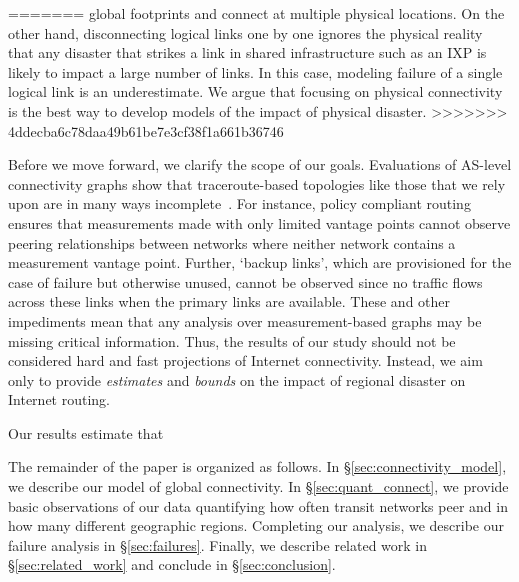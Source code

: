 =======
global footprints and connect at multiple physical locations.  On the other
hand, disconnecting logical links one by one ignores the physical reality that
any disaster that strikes a link in shared infrastructure such as an IXP is
likely to impact a large number of links.  In this case, modeling failure of a
single logical link is an underestimate.  We argue that focusing on physical
connectivity is the best way to develop models of the impact of physical
disaster. 
>>>>>>> 4ddecba6c78daa49b61be7e3cf38f1a661b36746


Before we move forward, we clarify the scope of our goals.  Evaluations of
AS-level connectivity graphs show that traceroute-based topologies like those
that we rely upon are in many ways incomplete~\cite{walter}.  For instance,
policy compliant routing ensures that measurements made with only limited
vantage points cannot observe peering relationships between networks where
neither network contains a measurement vantage point.  Further, `backup links',
which are provisioned for the case of failure but otherwise unused, cannot be
observed since no traffic flows across these links when the primary links are
available.  These and other impediments mean that any analysis over
measurement-based graphs may be missing critical information.  Thus, the
results of our study should not be considered hard and fast projections of
Internet connectivity.  Instead, we aim only to provide {\it estimates} and
{\it bounds} on the impact of regional disaster on Internet routing.

Our results estimate that \justine{\ldots}

The remainder of the paper is organized as follows. In \S\ref{sec:connectivity_model}, we describe our model of global connectivity.
In \S\ref{sec:quant_connect}, we provide basic observations of our data quantifying how often transit networks peer and in how many different geographic regions.
Completing our analysis, we describe our failure analysis in \S\ref{sec:failures}.
Finally, we describe related work in  \S\ref{sec:related_work} and conclude in \S\ref{sec:conclusion}.
